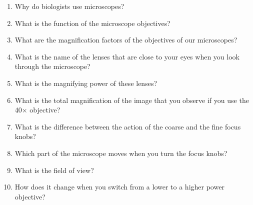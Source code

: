 \begin{enumerate}
\def\labelenumi{\arabic{enumi}.}
\tightlist
\item
  Why do biologists use microscopes?
\item
  What is the function of the microscope objectives?
\item
  What are the magnification factors of the objectives of our
  microscopes?
\item
  What is the name of the lenses that are close to your eyes when you
  look through the microscope?
\item
  What is the magnifying power of these lenses?
\item
  What is the total magnification of the image that you observe if you
  use the 40× objective?
\item
  What is the difference between the action of the coarse and the fine
  focus knobs?
\item
  Which part of the microscope moves when you turn the focus knobs?
\item
  What is the field of view?
\item
  How does it change when you switch from a lower to a higher power
  objective?
\end{enumerate}
